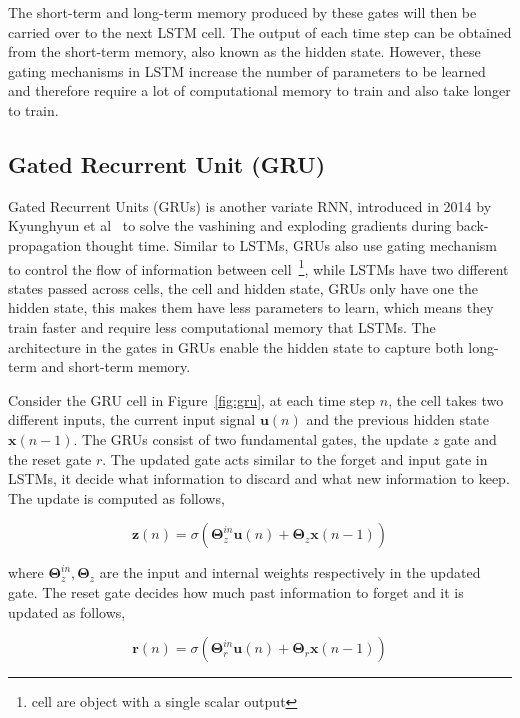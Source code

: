 \documentclass{WitsPhysicsReport}
\begin{document}
The short-term and long-term memory produced by these gates will then be carried over to the next LSTM cell. The output of each time step can be obtained from the short-term memory, also known as the hidden state. However, these gating mechanisms in LSTM increase the number of parameters to be learned and therefore require a lot of computational memory to train and also take longer to train.

\subsection{Gated Recurrent Unit (GRU)}
\label{sec:gated_recurrent_unit}
Gated Recurrent Units (GRUs) is another variate RNN, introduced in 2014 by Kyunghyun et al~\cite{bahdanau2014neural} to solve the vashining and exploding gradients during back-propagation thought time. Similar to LSTMs, GRUs also use gating mechanism to control the flow of information between cell~\footnote{cell are object with a single scalar output}, while LSTMs have two different states passed across cells, the cell and hidden state, GRUs only have one the hidden state, this makes them have less parameters to learn, which means they train faster and require less computational memory that LSTMs. The architecture in the gates in GRUs enable the hidden state to capture both long-term and short-term memory.


Consider the GRU cell in Figure~\ref{fig:gru}, at each time step $n$, the cell takes two different inputs, the current input signal $\mathbf{u}(n)$ and the previous hidden state $\mathbf{x}(n-1)$. The GRUs consist of two fundamental gates, the update $z$ gate and the reset gate $r$. The updated gate acts similar to the forget and input gate in LSTMs, it decide what  information to discard and what new information to keep. The update is computed as follows,

\begin{equation}
\mathbf{z}(n) = \sigma (\mathbf{\Theta}^{in}_{z} \mathbf{u}(n) + \mathbf{\Theta}_{z} \mathbf{x}(n-1))
\label{equ:update_gate}
\end{equation}


where $\mathbf{\Theta}^{in}_{z} , \mathbf{\Theta}_{z}$ are the input and internal weights respectively in the updated gate. The reset gate decides how much past information to forget and it is updated as follows,

\begin{equation}
\mathbf{r}(n) = \sigma (\mathbf{\Theta}^{in}_{r} \mathbf{u}(n) + \mathbf{\Theta}_{r} \mathbf{x}(n-1))
\label{equ:reset_gate}
\end{equation}
\end{document}

